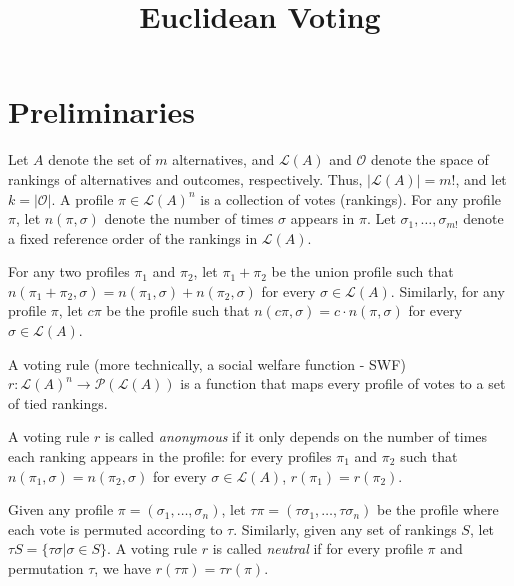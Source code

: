 \documentclass[10pt,letterpaper]{article}
\title{Euclidean Voting}
\newcommand{\calL}{{\mathcal{L}}}
\newcommand{\rank}{{\calL(A)}}
\newcommand{\calO}{{\mathcal{O}}}
\newcommand{\calP}{{\mathcal{P}}}
\newenvironment{definition}[1][Definition]{\begin{trivlist}
\item[\hskip \labelsep {\bfseries #1}]}{\end{trivlist}}
\begin{document}
\maketitle


\section{Preliminaries}

Let $A$ denote the set of $m$ alternatives, and $\rank$ and $\calO$ denote the space of rankings of alternatives and outcomes, respectively. Thus, $|\rank| = m!$, and let $k = |\calO|$. A profile $\pi \in \rank^n$ is a collection of votes (rankings). For any profile $\pi$, let $n(\pi,\sigma)$ denote the number of times $\sigma$ appears in $\pi$. Let $\sigma_1,\ldots,\sigma_{m!}$ denote a fixed reference order of the rankings in $\rank$. 

For any two profiles $\pi_1$ and $\pi_2$, let $\pi_1+\pi_2$ be the union profile such that $n(\pi_1+\pi_2,\sigma) = n(\pi_1,\sigma)+n(\pi_2,\sigma)$ for every $\sigma \in \rank$. Similarly, for any profile $\pi$, let $c \pi$ be the profile such that $n(c \pi,\sigma) = c \cdot n(\pi,\sigma)$ for every $\sigma \in \rank$. 


\begin{definition}[Voting Rule]
A voting rule (more technically, a social welfare function - SWF) $r : \rank^n \rightarrow \calP(\rank)$ is a function that maps every profile of votes to a set of tied rankings. 
\end{definition}


\begin{definition}[Anonymity]
A voting rule $r$ is called \emph{anonymous} if it only depends on the number of times each ranking appears in the profile: for every profiles $\pi_1$ and $\pi_2$ such that $n(\pi_1,\sigma) = n(\pi_2,\sigma)$ for every $\sigma \in \rank$, $r(\pi_1) = r(\pi_2)$. 
\end{definition}


\begin{definition}[Neutrality]
Given any profile $\pi = (\sigma_1,\ldots,\sigma_n)$, let $\tau \pi = (\tau \sigma_1,\ldots,\tau \sigma_n)$ be the profile where each vote is permuted according to $\tau$. Similarly, given any set of rankings $S$, let $\tau S = \{\tau \sigma | \sigma \in S\}$. A voting rule $r$ is called \emph{neutral} if for every profile $\pi$ and permutation $\tau$, we have $r(\tau \pi) = \tau r(\pi)$. 
\end{definition}
\end{document}
